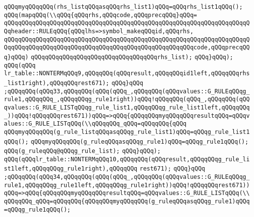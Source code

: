 \verb|qQQqmyqQQqqQQq(rhs_listqQQqasqQQqrhs_list1)qQQq=qQQqrhs_list1qQQq();|\newline
\verb|qQQq(mapqQQq(\\qQQq{qQQqrhs,qQQqcode,qQQqprecqQQq}qQQq=|\newline
\verb|qQQqqQQqqQQqqQQqqQQqqQQqqQQqqQQqqQQqqQQqqQQqqQQqqQQqqQQqqQQqqQQqqQQqqQQqheader::RULEqQQq{qQQqlhs=>symbol_makeqQQqid,qQQqrhs,|\newline
\verb|qQQqqQQqqQQqqQQqqQQqqQQqqQQqqQQqqQQqqQQqqQQqqQQqqQQqqQQqqQQqqQQqqQQqqQQqqQQqqQQqqQQqqQQqqQQqqQQqqQQqqQQqqQQqqQQqqQQqqQQqqQQqcode,qQQqprecqQQq}qQQq)|\newline
\verb|qQQqqQQqqQQqqQQqqQQqqQQqqQQqqQQqqQQqrhs_list);|\newline
\verb|qQQq}qQQq);|\newline
\verb|qQQq(qQQq|\newline
\verb|lr_table::NONTERMqQQq9,qQQqqQQq(qQQqresult,qQQqqQQqid1left,qQQqqQQqrhs_list1right),qQQqqQQqrest671);|\newline
\verb|qQQq}qQQq|\newline
\verb|;qQQqqQQq(qQQq33,qQQqqQQq(qQQq(qQQq_,qQQqqQQq(qQQqvalues::G_RULEqQQqg_rule1,qQQqqQQq_,qQQqqQQqg_rule1right))qQQq!qQQqqQQq(qQQq_,qQQqqQQq(qQQqvalues::G_RULE_LISTqQQqg_rule_list1,qQQqqQQqg_rule_list1left,qQQqqQQq_))qQQq!qQQqqQQqrest671))qQQq=>qQQq{qQQqqQQqmyqQQqqQQqresultqQQq=qQQqvalues::G_RULE_LISTqQQq(\\qQQqqQQq_qQQq=qQQqqQQq{qQQq|\newline
\verb|qQQqmyqQQqqQQq(g_rule_listqQQqasqQQqg_rule_list1)qQQq=qQQqg_rule_list1qQQq();|\newline
\verb|qQQqmyqQQqqQQq(g_ruleqQQqasqQQqg_rule1)qQQq=qQQqg_rule1qQQq();|\newline
\verb|qQQq(g_ruleqQQq@qQQqg_rule_list);|\newline
\verb|qQQq}qQQq);|\newline
\verb|qQQq(qQQqlr_table::NONTERMqQQq10,qQQqqQQq(qQQqresult,qQQqqQQqg_rule_list1left,qQQqqQQqg_rule1right),qQQqqQQq|\newline
\verb|rest671);|\newline
\verb|qQQq}qQQq|\newline
\verb|;qQQqqQQq(qQQq34,qQQqqQQq(qQQq(qQQq_,qQQqqQQq(qQQqvalues::G_RULEqQQqg_rule1,qQQqqQQqg_rule1left,qQQqqQQqg_rule1right))qQQq!qQQqqQQqrest671))qQQq=>qQQq{qQQqqQQqmyqQQqqQQqresultqQQq=qQQqvalues::G_RULE_LISTqQQq(\\qQQqqQQq_qQQq=qQQqqQQq{qQQqqQQqmyqQQqqQQq(g_ruleqQQqasqQQqg_rule1)qQQq=qQQqg_rule1qQQq();|\newline
